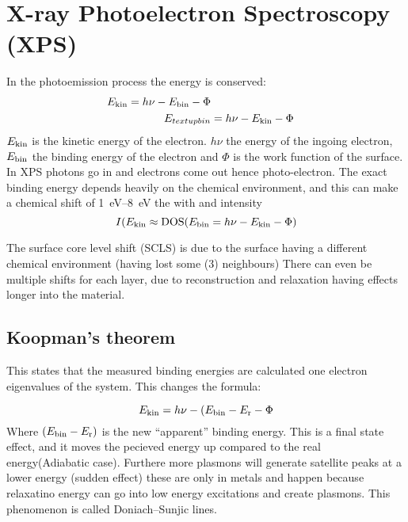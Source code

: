 \documentclass[article,oneside]{memoir}
\begin{document}
\chapter{X-ray Photoelectron Spectroscopy (XPS)}
In the photoemission process the energy is conserved:
\begin{align*}
        E_{\textup{kin}}=h\nu -E_{\textup{bin}} -\Phi\\
        E_{textup{bin}}&=h\nu - E_{\textup{kin}} -\Phi
\end{align*}
$E_{\textup{kin}}$ is the kinetic energy of the electron. $h\nu$ the energy of the ingoing electron, $E_{\textup{bin}}$ the binding energy of the electron and $\Phi$ is the work function of the surface.
In XPS photons go in and electrons come out hence photo-electron. The exact binding energy depends heavily on the chemical environment, and this can make a chemical shift of \SIrange{1}{8}{\eV} the with and intensity 
$$I(E_{\textup{kin}}\approx\textup{DOS}(E_{\textup{bin}}=h\nu-E_{\textup{kin}}-\Phi)$$

The surface core level shift (SCLS) is due to the surface having a different chemical environment (having lost some (3) neighbours) There can even be multiple shifts for each layer, due to reconstruction and relaxation having effects longer into the material.

\section{Koopman's theorem}
This states that the measured binding energies are calculated one electron eigenvalues of the system. This changes the formula:


\begin{equation*}
        E_{\textup{kin}}=h\nu-(E_{\textup{bin}}-E_{\textup{r}}-\Phi
\end{equation*}
Where $(E_{\textup{bin}}-E_{\textup{r}})$ is the new ``apparent'' binding energy.
This is a final state effect, and it moves the pecieved energy up compared to the real energy(Adiabatic case). Furthere more plasmons will generate satellite peaks at a lower energy (sudden effect) these are only in metals and happen because relaxatino energy can go into low energy excitations and create plasmons. This phenomenon is called Doniach--Sunjic lines.
\end{document}
